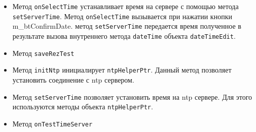 \begin{itemize}
	\item Метод \texttt{onSelectTime} устанавливает время на сервере с помощью метода \texttt{setServerTime}. Метод
		\texttt{onSelectTime} вызывается при нажатии кнопки {m\_btConfirmDate}.
		метод \texttt{setServerTime} передается время полученное в результате вызова внутреннего метода
		\texttt{dateTime} объекта \texttt{dateTimeEdit}.

	\item Метод \texttt{saveRezTest}
	\item Метод \texttt{initNtp} инициалирует \texttt{ntpHelperPtr}. Данный метод позволяет установить соединение с
		ntp сервером.

	\item Метод \texttt{setServerTime} позволяет установить время на ntp сервере. Для этого используются методы
		объекта \texttt{ntpHelperPtr}.

	\item Метод \texttt{onTestTimeServer}
\end{itemize}

